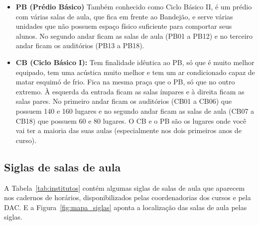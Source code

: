 \begin{itemize}
    \item  \textbf{PB (Prédio Básico)} Também conhecido como Ciclo Básico II, é
        um prédio com várias salas de aula, que fica em frente ao Bandejão, e
        serve várias unidades que não possuem espaço físico suficiente para
        comportar seus alunos. No segundo andar ficam as salas de aula (PB01 a
        PB12) e no terceiro andar ficam os auditórios (PB13 a PB18).

    \item  \textbf{CB (Ciclo Básico I):} Tem finalidade idêntica ao PB, só que é
        muito melhor equipado, tem uma acústica muito melhor e tem um ar
        condicionado capaz de matar esquimó de frio. Fica na mesma praça que o
        PB, só que no outro extremo. À esquerda da entrada ficam as salas
        ímpares e à direita ficam as salas pares. No primeiro andar ficam os
        auditórios (CB01 a CB06) que possuem 140 e 160 lugares e no segundo
        andar ficam as salas de aula (CB07 a CB18) que possuem 60 e 80 lugares.
        O CB e o PB são os lugares onde você vai ter a maioria das suas aulas
        (especialmente nos dois primeiros anos de curso).
\end{itemize}

\subsection{Siglas de salas de aula}

A Tabela~\ref{tab:institutos} contém algumas siglas de salas de aula que
aparecem nos cadernos de horários, disponibilizados pelas coordenadorias dos
cursos e pela DAC. E a Figura~\ref{fig:mapa_siglas} aponta a localização das
salas de aula pelas siglas.

